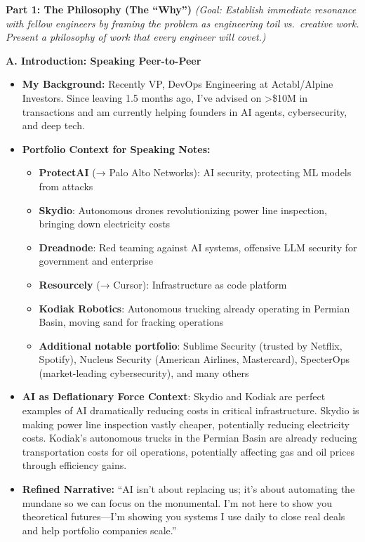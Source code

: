 \documentclass[
  ignorenonframetext,
  aspectratio=169,
]{beamer}
\providecommand{\tightlist}{%
  \setlength{\itemsep}{0pt}\setlength{\parskip}{0pt}}
\begin{document}
\begin{frame}{\textbf{Part 1: The Philosophy (The ``Why'')}}
\label{part-1-the-philosophy-the-why}
\emph{(Goal: Establish immediate resonance with fellow engineers by
framing the problem as engineering toil vs.~creative work. Present a
philosophy of work that every engineer will covet.)}

\begin{block}{\textbf{A. Introduction: Speaking Peer-to-Peer}}
\label{a.-introduction-speaking-peer-to-peer}
\begin{itemize}
\item
  \textbf{My Background:} Recently VP, DevOps Engineering at
  Actabl/Alpine Investors. Since leaving 1.5 months ago, I've advised on
  \textgreater\$10M in transactions and am currently helping founders in
  AI agents, cybersecurity, and deep tech.
\item
  \textbf{Portfolio Context for Speaking Notes:}

  \begin{itemize}
  \tightlist
  \item
    \textbf{ProtectAI} (→ Palo Alto Networks): AI security, protecting
    ML models from attacks
  \item
    \textbf{Skydio}: Autonomous drones revolutionizing power line
    inspection, bringing down electricity costs
  \item
    \textbf{Dreadnode}: Red teaming against AI systems, offensive LLM
    security for government and enterprise
  \item
    \textbf{Resourcely} (→ Cursor): Infrastructure as code platform
  \item
    \textbf{Kodiak Robotics}: Autonomous trucking already operating in
    Permian Basin, moving sand for fracking operations
  \item
    \textbf{Additional notable portfolio}: Sublime Security (trusted by
    Netflix, Spotify), Nucleus Security (American Airlines, Mastercard),
    SpecterOps (market-leading cybersecurity), and many others
  \end{itemize}
\item
  \textbf{AI as Deflationary Force Context}: Skydio and Kodiak are
  perfect examples of AI dramatically reducing costs in critical
  infrastructure. Skydio is making power line inspection vastly cheaper,
  potentially reducing electricity costs. Kodiak's autonomous trucks in
  the Permian Basin are already reducing transportation costs for oil
  operations, potentially affecting gas and oil prices through
  efficiency gains.
\item
  \textbf{Refined Narrative:} ``AI isn't about replacing us; it's about
  automating the mundane so we can focus on the monumental. I'm not here
  to show you theoretical futures---I'm showing you systems I use daily
  to close real deals and help portfolio companies scale.''
\end{itemize}
\end{block}


\end{frame}
\end{document}
